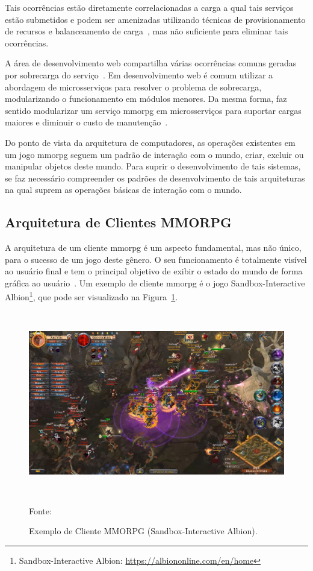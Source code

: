 Tais ocorrências estão diretamente correlacionadas a carga a qual tais serviços estão submetidos e podem ser amenizadas utilizando técnicas de provisionamento de recursos e balanceamento de carga~\cite{1417630}, mas não suficiente para eliminar tais ocorrências.

A área de desenvolvimento web compartilha várias ocorrências comuns geradas por sobrecarga do serviço~\cite{7830692}.
%
Em desenvolvimento web é comum utilizar a abordagem de microsserviços para resolver o problema de sobrecarga, modularizando o  funcionamento em módulos menores.
%
Da mesma forma, faz sentido modularizar um serviço \ac{mmorpg} em microsserviços para suportar cargas maiores e diminuir o custo de manutenção~\cite{7515686}.



Do ponto de vista da arquitetura de computadores, as operações existentes em um jogo \ac{mmorpg} seguem um padrão de interação com o mundo, criar, excluir ou manipular objetos deste mundo.
%
Para suprir o desenvolvimento de tais sistemas, se faz necessário compreender os padrões de desenvolvimento de tais arquiteturas na qual suprem as operações básicas de interação com o mundo.



\subsection{Arquitetura de Clientes MMORPG}
\label{sec:cliente}



A arquitetura de um cliente \ac{mmorpg} é um aspecto fundamental, mas não único, para o sucesso de um jogo deste gênero.
%
O seu funcionamento é totalmente visível ao usuário final e tem o principal objetivo de exibir o estado do mundo de forma gráfica ao usuário~\cite{albion_online_unite}.
%
Um exemplo de cliente \ac{mmorpg} é o jogo Sandbox-Interactive Albion\footnote{Sandbox-Interactive Albion: \url{https://albiononline.com/en/home}}, que pode ser visualizado na Figura~\ref{fig:cliente_albion}.



\begin{figure}[htb!]
\caption{Exemplo de Cliente MMORPG (Sandbox-Interactive Albion).}
\label{fig:cliente_albion}
\includegraphics[height=8cm]{img/cap2/cliente_albion.png}
\centering

Fonte:~\cite{albion_online_unite}
\end{figure}


